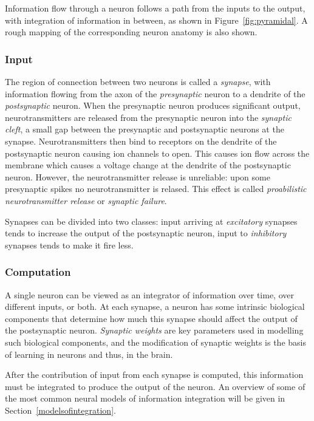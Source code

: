 \documentclass[a4paper,12pt]{report}
\theoremstyle{definition}
\begin{document}
Information flow through a neuron follows a path from the inputs to the output, with integration of information in between, as shown in Figure~\ref{fig:pyramidal}. A rough mapping of the corresponding neuron anatomy is also shown.


\subsubsection{Input}

The region of connection between two neurons is called a \emph{synapse}, with information flowing from the axon of the \emph{presynaptic} neuron to a dendrite of the \emph{postsynaptic} neuron. When the presynaptic neuron produces significant output, neurotransmitters are released from the presynaptic neuron into the \emph{synaptic cleft}, a small gap between the presynaptic and postsynaptic neurons at the synapse.
Neurotransmitters then bind to receptors on the dendrite of the postsynaptic neuron causing ion channels to open. This causes ion flow across the membrane which causes a voltage change at the dendrite of the postsynaptic neuron. However, the neurotransmitter release is unreliable: upon some presynaptic spikes no neurotransmitter is relased. This effect is called \emph{proabilistic neurotransmitter release} or \emph{synaptic failure}.

Synapses can be divided into two classes: input arriving at \emph{excitatory} synapses tends to increase the output of the postsynaptic neuron, input to \emph{inhibitory} synapses tends to make it fire less.

\subsubsection{Computation}
A single neuron can be viewed as an integrator of information over time, over different inputs, or both. At each synapse, a neuron has some intrinsic biological components that determine how much this synapse should affect the output of the postsynaptic neuron. \emph{Synaptic weights} are key parameters used in modelling such biological components, and the modification of synaptic weights is the basis of learning in neurons and thus, in the brain.

After the contribution of input from each synapse is computed, this information must be integrated to produce the output of the neuron. An overview of some of the most common neural models of information integration will be given in Section~\ref{modelsofintegration}.
\end{document}
